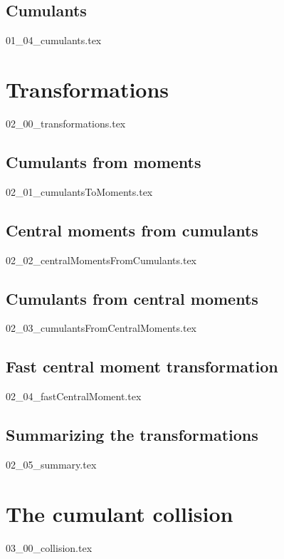 \documentclass[12pt,a4paper,twoside]{article}
\begin{document}
\subsection{Cumulants}
\label{sub: Cumulants}
{01_04_cumulants.tex}

\section{Transformations}
\label{sec: Transformations}
{02_00_transformations.tex}

\subsection{Cumulants from moments}
\label{sub: Cumulants from moments}
{02_01_cumulantsToMoments.tex}

\subsection{Central moments from cumulants}
\label{sub: Central moments from cumulants}
{02_02_centralMomentsFromCumulants.tex}

\subsection{Cumulants from central moments}
\label{sub: Cumulants from central moments}
{02_03_cumulantsFromCentralMoments.tex}

\subsection{Fast central moment transformation}
\label{sub: Fast central moment transformation}
{02_04_fastCentralMoment.tex}

\subsection{Summarizing the transformations}
\label{sub: Summarizing the transformations}
{02_05_summary.tex}

\section{The cumulant collision}
\label{sec: The cumulant collision}
{03_00_collision.tex}
\end{document}
